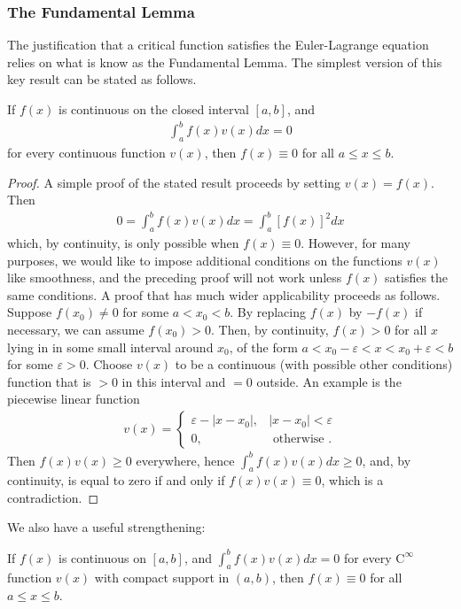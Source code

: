 \documentclass{article}
\begin{document}
\subsubsection{The Fundamental Lemma}
The justification that a critical function satisfies the Euler-Lagrange equation relies on what is know as the Fundamental Lemma. The simplest version of this key result can be stated as follows.
\begin{lema}\label{lem:fund1}
If $f(x)$ is continuous on the closed interval $[a, b]$, and
\begin{align*}
\int_{a}^{b} f(x) v(x) d x=0
\end{align*}
for every continuous function $v(x)$, then $f(x) \equiv 0$ for all $a \leq x \leq b .$
\end{lema}
\begin{proof}
A simple proof of the stated result proceeds by setting $v(x)=f(x) .$ Then
\begin{align*}
0=\int_{a}^{b} f(x) v(x) d x=\int_{a}^{b}[f(x)]^{2} d x
\end{align*}
which, by continuity, is only possible when $f(x) \equiv 0$.
However, for many purposes, we would like to impose additional conditions on the functions $v(x)$ like smoothness, and the preceding proof will not work unless $f(x)$ satisfies the same conditions. A proof that has much wider applicability proceeds as follows. Suppose $f\left(x_{0}\right) \neq 0$ for some $a<x_{0}<b$. By replacing $f(x)$ by $-f(x)$ if necessary, we can assume $f\left(x_{0}\right)>0$. Then, by continuity, $f(x)>0$ for all $x$ lying in in some small interval around $x_{0}$, of the form $a<x_{0}-\varepsilon<x<x_{0}+\varepsilon<b$ for some $\varepsilon>0$. Choose $v(x)$ to be a continuous (with possible other conditions) function that is $>0$ in this interval and $=0$ outside. An example is the piecewise linear function
\begin{align*}
v(x)= \begin{cases}\varepsilon-\left|x-x_{0}\right|, & \left|x-x_{0}\right|<\varepsilon \\ 0, & \text { otherwise .}\end{cases}
\end{align*}
Then $f(x) v(x) \geq 0$ everywhere, hence $\int_{a}^{b} f(x) v(x) d x \geq 0$, and, by continuity, is equal to zero if and only if $f(x) v(x) \equiv 0$, which is a contradiction.
\end{proof} 
 We also have a useful strengthening:
\begin{lema}\label{lem:fund2}
If $f(x)$ is continuous on $[a, b]$, and $\int_{a}^{b} f(x) v(x) d x=0$ for every $\mathrm{C}^{\infty}$ function $v(x)$ with compact support in $(a, b)$, then $f(x) \equiv 0$ for all $a \leq x \leq b .$
\end{lema} 
\end{document}
